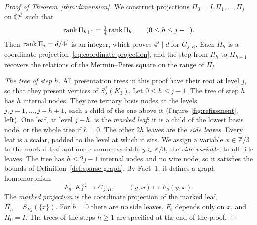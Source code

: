 \begin{proof}[Proof of Theorem~\ref{thm:dimension}]
We construct projections $\Pi_0=I,\Pi_1,\ldots,\Pi_j$ on $\mathbb C^d$ such that
\[
 \operatorname{rank}\Pi_{h+1}=\tfrac14\operatorname{rank}\Pi_h\qquad(0\le h\le j-1).
\]
Then $\operatorname{rank}\Pi_j=d/4^j$ is an integer, which proves $4^j\mid d$ for $G_{j,R}$. Each $\Pi_h$ is a coordinate projection~\eqref{eq:coordinate-projection}, and the step from $\Pi_h$ to $\Pi_{h+1}$ recovers the relations of the Mermin--Peres square on the range of $\Pi_h$.

\emph{The tree of step $h$.} All presentation trees in this proof have their root at level $j$, so that they present vertices of $S^j_\lambda(K_3)$. Let $0\le h\le j-1$. The tree of step $h$ has $h$ internal nodes. They are ternary basis nodes at the levels $j,j-1,\ldots,j-h+1$, each a child of the one above it (Figure~\ref{fig:refinement}, left). One leaf, at level $j-h$, is the \emph{marked leaf}; it is a child of the lowest basis node, or the whole tree if $h=0$. The other $2h$ leaves are the \emph{side leaves}. Every leaf is a scalar, padded to the level at which it sits. We assign a variable $x\in\mathbb Z/3$ to the marked leaf and one common variable $y\in\mathbb Z/3$, the \emph{side variable}, to all side leaves. The tree has $h\le2j-1$ internal nodes and no wire node, so it satisfies the bounds of Definition~\ref{def:sparse-graph}. By Fact~1, it defines a graph homomorphism
\[
 F_h:K_3^{\times2}\to G_{j,R},\qquad (y,x)\mapsto F_h(y,x).
\]
The \emph{marked projection} is the coordinate projection of the marked leaf, $\Pi_h=S_{F_h}(\{x\})$. For $h=0$ there are no side leaves, $F_0$ depends only on $x$, and $\Pi_0=I$. The trees of the steps $h\ge1$ are specified at the end of the proof.


\end{proof}
